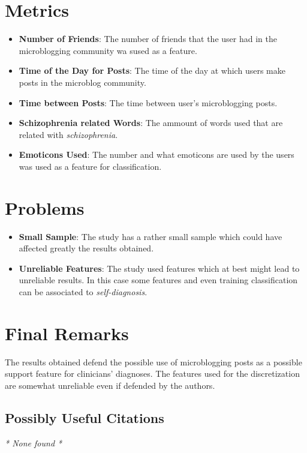 \documentclass{Paper_Summary}
\begin{document}
\section{Metrics}
    \begin{itemize}
        \item \textbf{Number of Friends}: The number of friends that the user had in the microblogging community wa sused as a feature.
        \item \textbf{Time of the Day for Posts}: The time of the day at which users make posts in the microblog community.
        \item \textbf{Time between Posts}: The time between user's microblogging posts.
        \item \textbf{Schizophrenia related Words}: The ammount of words used that are related with \emph{schizophrenia}.
        \item \textbf{Emoticons Used}: The number and what emoticons are used by the users was used as a feature for classification.
    \end{itemize}

\section{Problems}
    \begin{itemize}
        \item \textbf{Small Sample}: The study has a rather small sample which could have affected greatly the results obtained.
        \item \textbf{Unreliable Features}: The study used features which at best might lead to unreliable results. In this case some features and even training classification can be associated to \emph{self-diagnosis}.
    \end{itemize}


\section{Final Remarks}
    
    The results obtained defend the possible use of microblogging posts as a possible support feature for clinicians' diagnoses. The features used for the discretization are somewhat unreliable even if defended by the authors.

\breakline

\begin{center}
    \section*{Possibly Useful Citations}
\end{center}
\emph{* None found *}
\end{document}
